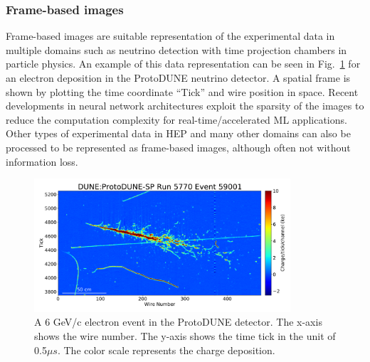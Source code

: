 \subsubsection{Frame-based images}
Frame-based images are suitable representation of the experimental data in multiple domains such as neutrino detection with time projection chambers in particle physics. An example of this data representation can be seen in Fig.~\ref{fig:repframe} for an electron deposition in the ProtoDUNE neutrino detector.  A spatial frame is shown by plotting the time coordinate ``Tick'' and wire position in space. Recent developments in neural network architectures exploit the sparsity of the images to reduce the computation complexity for real-time/accelerated ML applications. Other types of experimental data in HEP and many other domains can also be processed to be represented as frame-based images, although often not without information loss. 
\begin{figure}[tbh!]
    \centering
    \includegraphics[width = 0.85\textwidth]{figures/R5770_E59001_T1T5T9_w0_480_t3750_5250_sc15.pdf}
    \caption{A 6 GeV/c electron event in the ProtoDUNE detector. The x-axis shows the wire number. The y-axis shows the time tick in the unit of 0.5$\mu s$. The color scale represents the charge deposition.\cite{}}
    \label{fig:repframe}
\end{figure}

